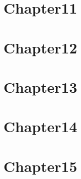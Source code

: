 \documentclass[10pt]{article}
\begin{document}
  \newpage
  \section*{Chapter11}
  
  
  \newpage
  \section*{Chapter12}
  
  
  \newpage
  \section*{Chapter13}
  
  
  \newpage
  \section*{Chapter14}
  
  
  \newpage
  \section*{Chapter15}
  
\end{document}
